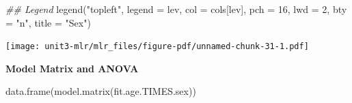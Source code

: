 \documentclass[
  letterpaper,
]{scrbook}
\newenvironment{Shaded}{\begin{snugshade}}{\end{snugshade}}
\newcommand{\AttributeTok}[1]{\textcolor[rgb]{0.40,0.45,0.13}{#1}}
\newcommand{\DecValTok}[1]{\textcolor[rgb]{0.68,0.00,0.00}{#1}}
\newcommand{\DocumentationTok}[1]{\textcolor[rgb]{0.37,0.37,0.37}{\textit{#1}}}
\newcommand{\FunctionTok}[1]{\textcolor[rgb]{0.28,0.35,0.67}{#1}}
\newcommand{\NormalTok}[1]{\textcolor[rgb]{0.00,0.23,0.31}{#1}}
\newcommand{\StringTok}[1]{\textcolor[rgb]{0.13,0.47,0.30}{#1}}
\begin{document}
\begin{Shaded}
\begin{Highlighting}[]
\DocumentationTok{\#\# Legend}
\FunctionTok{legend}\NormalTok{(}\StringTok{"topleft"}\NormalTok{, }\AttributeTok{legend =}\NormalTok{ lev, }\AttributeTok{col =}\NormalTok{ cols[lev], }\AttributeTok{pch =} \DecValTok{16}\NormalTok{, }\AttributeTok{lwd =} \DecValTok{2}\NormalTok{, }\AttributeTok{bty =} \StringTok{"n"}\NormalTok{, }\AttributeTok{title =} \StringTok{"Sex"}\NormalTok{)}
\end{Highlighting}
\end{Shaded}

\texttt{[image: unit3-mlr/mlr\_files/figure-pdf/unnamed-chunk-31-1.pdf]}

\textbf{Model Matrix and ANOVA}

\begin{Shaded}
\begin{Highlighting}[]
\FunctionTok{data.frame}\NormalTok{(}\FunctionTok{model.matrix}\NormalTok{(fit.age.TIMES.sex))}
\end{Highlighting}
\end{Shaded}
\end{document}
